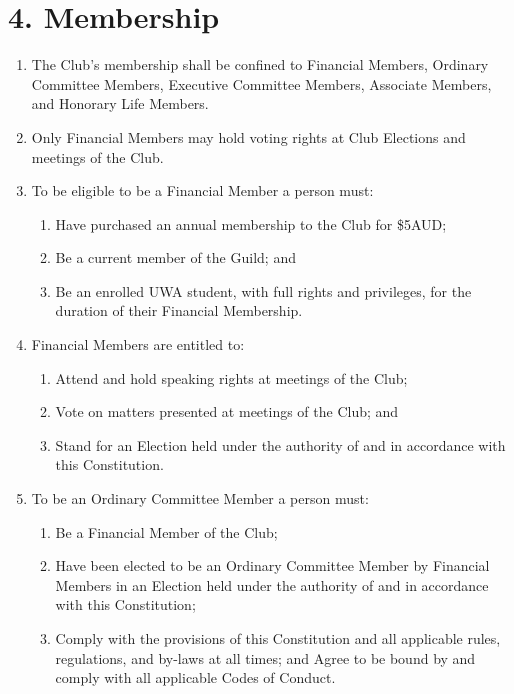 \documentclass[12pt]{article}
\begin{document}
\section{4. Membership}
\begin{enumerate}[label=4.\arabic*]
    \item The Club’s membership shall be confined to Financial Members, Ordinary Committee Members, Executive Committee Members, Associate Members, and Honorary Life Members.
    \item Only Financial Members may hold voting rights at Club Elections and meetings of the Club.
    \item To be eligible to be a Financial Member a person must:
    \begin{enumerate}[label=\theenumi.\arabic*]
        \item Have purchased an annual membership to the Club for \$5AUD;
        \item Be a current member of the Guild; and
        \item Be an enrolled UWA student, with full rights and privileges, for the duration of their Financial Membership.
    \end{enumerate}
    \item Financial Members are entitled to:
    \begin{enumerate}[label=\theenumi.\arabic*]
        \item Attend and hold speaking rights at meetings of the Club;
        \item Vote on matters presented at meetings of the Club; and
        \item Stand for an Election held under the authority of and in accordance with this Constitution.
    \end{enumerate}
    \item To be an Ordinary Committee Member a person must:
    \begin{enumerate}[label=\theenumi.\arabic*]
        \item Be a Financial Member of the Club;
        \item Have been elected to be an Ordinary Committee Member by Financial Members in an Election held under the authority of and in accordance with this Constitution;
        \item Comply with the provisions of this Constitution and all applicable rules, regulations, and by-laws at all times; and Agree to be bound by and comply with all applicable Codes of Conduct.
    \end{enumerate}

\end{enumerate}
\end{document}
